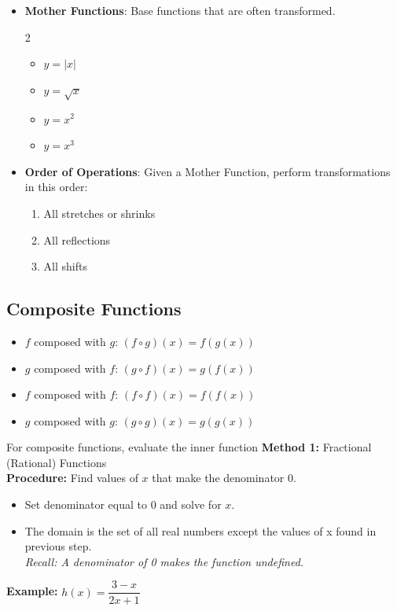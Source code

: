 \documentclass[10pt]{article}
\begin{document}
\begin{itemize}
    \item \textbf{Mother Functions}: Base functions that are often transformed.
        \begin{multicols}{2}
        \begin{itemize}[label=$\circ$]
            \item $y = |x|$
            \item $y = \sqrt{x}$
            \item $y=x^2$
            \item $y=x^3$
        \end{itemize}
        \end{multicols}
    
    
    \item \textbf{Order of Operations}: Given a Mother Function, perform transformations in this order:
    \indent \begin{enumerate}
        \item All stretches or shrinks
        \item All reflections
        \item All shifts
    \end{enumerate}
    

\end{itemize}


\newpage

\subsection*{Composite Functions}

\begin{itemize}
    \item $f$ composed with $g$: $(f \circ g)(x) = f(g(x))$
    \item $g$ composed with $f$: $(g \circ f)(x) = g(f(x))$
    \item $f$ composed with $f$: $(f \circ f)(x) = f(f(x))$
    \item $g$ composed with $g$: $(g \circ g)(x) = g(g(x))$
\end{itemize}

For composite functions, evaluate the inner function 
\textbf{Method 1:} Fractional (Rational) Functions\\
{\color{magenta}
\textbf{Procedure:} Find values of $x$ that make the denominator 0.}
\begin{itemize}
    \item Set denominator equal to 0 and solve for $x$.
    \item The domain is the set of all real numbers except the values of x found in previous step. \\
    \textit{Recall: A denominator of 0 makes the function undefined.}
\end{itemize}
{\color{blue}
\textbf{Example:}} $h(x) = \dfrac{3-x}{2x+1}$
\end{document}
